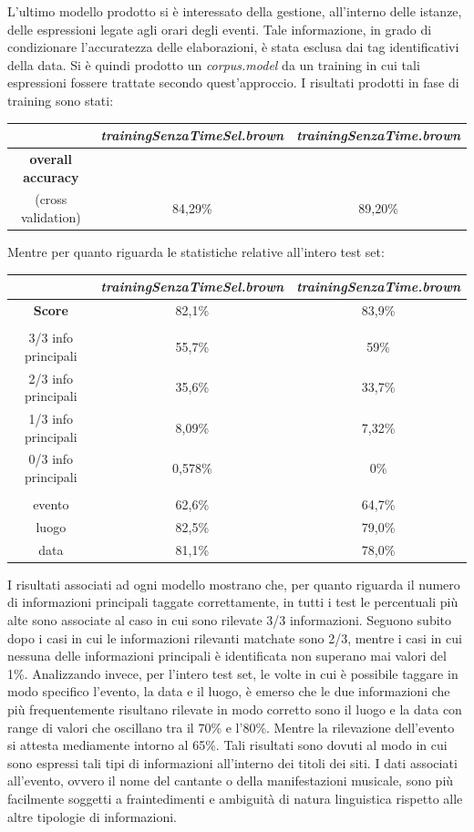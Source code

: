 \documentclass[a4paper]{report}
\begin{document}
L'ultimo modello prodotto si è interessato della gestione, all'interno delle istanze, delle espressioni legate agli orari degli eventi. Tale informazione, in grado di condizionare l'accuratezza delle elaborazioni, è stata esclusa dai tag identificativi della data. Si è quindi prodotto un \textit{corpus.model} da un training in cui tali espressioni fossere trattate secondo quest'approccio. I risultati prodotti in fase di training sono stati:
\begin{center}
\begin{tabular}{c c c}
\hline
 & \textit{trainingSenzaTimeSel.brown} & \textit{trainingSenzaTime.brown}\\
\hline
\textbf{overall accuracy} \\ (cross validation) & 84,29\% & 89,20\% \\
\hline
\end{tabular}
\end{center}
Mentre per quanto riguarda le statistiche relative all'intero test set:
\begin{center}
\begin{tabular}{|ccc|}
\hline
 & \textit{trainingSenzaTimeSel.brown} & \textit{trainingSenzaTime.brown}\\
\hline
\textbf{Score} & 82,1\% & 83,9\% \\
\hline
 & &  \\
\hline
3/3 info principali & 55,7\% & 59\% \\
2/3 info principali & 35,6\% & 33,7\% \\
1/3 info principali & 8,09\% & 7,32\% \\
0/3 info principali & 0,578\% & 0\% \\
\hline
 & &  \\
\hline
evento & 62,6\% & 64,7\% \\
luogo & 82,5\% & 79,0\% \\
data & 81,1\% & 78,0\% \\
\hline
\end{tabular}
\end{center}
I risultati associati ad ogni modello mostrano che, per quanto riguarda il numero di informazioni principali taggate correttamente, in tutti i test le percentuali più alte sono associate al caso in cui sono rilevate 3/3 informazioni. Seguono subito dopo i casi in cui le informazioni rilevanti matchate sono 2/3, mentre i casi in cui nessuna delle informazioni principali è identificata non superano mai valori del 1\%. Analizzando invece, per l'intero test set, le volte in cui è possibile taggare in modo specifico l'evento, la data e il luogo, è emerso che le due informazioni che più frequentemente risultano rilevate in modo corretto sono il luogo e la data con range di valori che oscillano tra il 70\% e l'80\%. Mentre la rilevazione dell'evento si attesta mediamente intorno al 65\%. Tali risultati sono dovuti al modo in cui sono espressi tali tipi di informazioni all'interno dei titoli dei siti. I dati associati all'evento, ovvero il nome del cantante o della manifestazioni musicale, sono più facilmente soggetti a fraintedimenti e ambiguità di natura linguistica rispetto alle altre tipologie di informazioni.
\end{document}
